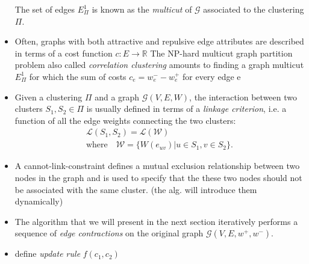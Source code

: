 \begin{itemize}
The set of edges $E_\Pi^1$ is known as the \emph{multicut} of $\mathcal{G}$ associated to the clustering $\Pi$. 
\item Often, graphs with both attractive and repulsive edge attributes are described in terms of a cost function $c: E \rightarrow \mathbb{R}$   The NP-hard multicut graph partition problem also called \emph{correlation clustering}  amounts to finding a graph multicut $E^1_\Pi$ for which the sum of costs $c_e = w^-_e - w^+_e$  
for every edge e
\item Given a clustering $\Pi$ and a graph $\mathcal{G}(V,E,W)$, the interaction between two clusters $S_1, S_2 \in \Pi$ is usually defined in terms of a \emph{linkage criterion}, i.e. a function of all the edge weights connecting the two clusters:
\begin{equation} \label{eq:linkage_criterion_def}
\begin{gathered}
\mathcal{L}(S_1,S_2) = \mathcal{L}(\mathcal{W})\quad \\
   \text{where} \quad \mathcal{W} = \{ W(e_{uv})| u\in S_1, v\in S_2 \}.
\end{gathered}
\end{equation}

\item A cannot-link-constraint defines a mutual exclusion relationship between two nodes in the graph and is used to specify that the these two nodes should not be associated with the same cluster. (the alg. will introduce them dynamically)
\item The algorithm that we will present in the next section iteratively performs a sequence of \emph{edge contractions} on the original graph $\mathcal{G}(V,E,w^+, w^-)$.

\item define \emph{update rule} $f(c_1, c_2)$

\end{itemize}


